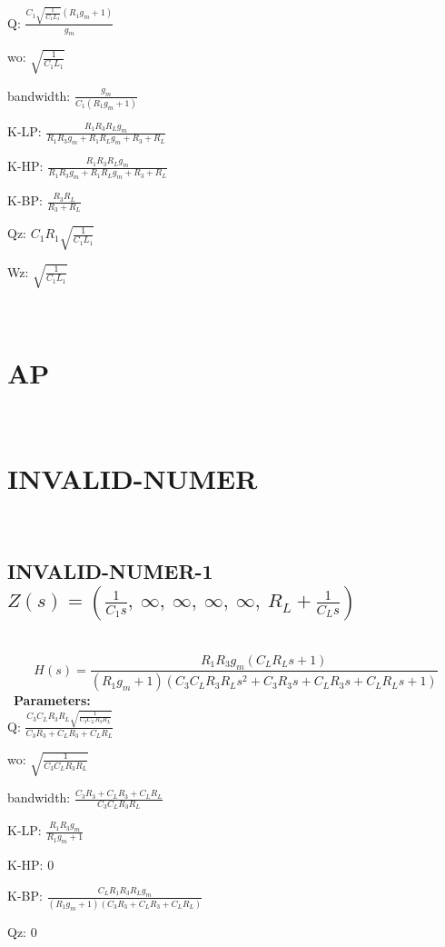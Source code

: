 \documentclass{article}
\begin{document}
Q: $\frac{C_{1} \sqrt{\frac{1}{C_{1} L_{1}}} \left(R_{1} g_{m} + 1\right)}{g_{m}}$\ 

wo: $\sqrt{\frac{1}{C_{1} L_{1}}}$\ 

bandwidth: $\frac{g_{m}}{C_{1} \left(R_{1} g_{m} + 1\right)}$\ 

K-LP: $\frac{R_{1} R_{3} R_{L} g_{m}}{R_{1} R_{3} g_{m} + R_{1} R_{L} g_{m} + R_{3} + R_{L}}$\ 

K-HP: $\frac{R_{1} R_{3} R_{L} g_{m}}{R_{1} R_{3} g_{m} + R_{1} R_{L} g_{m} + R_{3} + R_{L}}$\ 

K-BP: $\frac{R_{3} R_{L}}{R_{3} + R_{L}}$\ 

Qz: $C_{1} R_{1} \sqrt{\frac{1}{C_{1} L_{1}}}$\ 

Wz: $\sqrt{\frac{1}{C_{1} L_{1}}}$\ 

\ 

\section{AP}\ 
\section{INVALID-NUMER}\ 
\subsection{INVALID-NUMER-1 $Z(s) = \left( \frac{1}{C_{1} s}, \  \infty, \  \infty, \  \infty, \  \infty, \  R_{L} + \frac{1}{C_{L} s}\right)$ } \ 
\textbf{\[H(s) = \frac{R_{1} R_{3} g_{m} \left(C_{L} R_{L} s + 1\right)}{\left(R_{1} g_{m} + 1\right) \left(C_{3} C_{L} R_{3} R_{L} s^{2} + C_{3} R_{3} s + C_{L} R_{3} s + C_{L} R_{L} s + 1\right)}\] } \ 
\textbf{Parameters:}\\ 

Q: $\frac{C_{3} C_{L} R_{3} R_{L} \sqrt{\frac{1}{C_{3} C_{L} R_{3} R_{L}}}}{C_{3} R_{3} + C_{L} R_{3} + C_{L} R_{L}}$\ 

wo: $\sqrt{\frac{1}{C_{3} C_{L} R_{3} R_{L}}}$\ 

bandwidth: $\frac{C_{3} R_{3} + C_{L} R_{3} + C_{L} R_{L}}{C_{3} C_{L} R_{3} R_{L}}$\ 

K-LP: $\frac{R_{1} R_{3} g_{m}}{R_{1} g_{m} + 1}$\ 

K-HP: $0$\ 

K-BP: $\frac{C_{L} R_{1} R_{3} R_{L} g_{m}}{\left(R_{1} g_{m} + 1\right) \left(C_{3} R_{3} + C_{L} R_{3} + C_{L} R_{L}\right)}$\ 

Qz: $0$\ 
\end{document}
